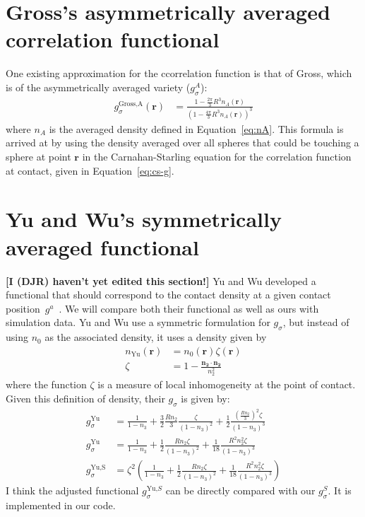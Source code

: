 \documentclass[letterpaper,twocolumn,amsmath,amssymb,jcp,10pt,aip]{revtex4-1}
\newcommand{\red}[1]{{\bf \color{red} #1}}
\newcommand{\rr}{\textbf{r}}
\newcommand{\fixme}[1]{\red{[#1]}}
\begin{document}
\section{Gross's asymmetrically averaged correlation functional}\label{sec:gross}
One existing approximation for the ccorrelation function is that of
Gross\cite{gross2009density}, which is of the asymmetrically averaged
variety ($g_\sigma^A$):
\begin{align}
  g_\sigma^\text{Gross,A}(\rr) &= \frac{1 - \frac{2\pi}{3}R^3n_A(\rr)}{\left(1 -
    \frac{4\pi}{3}R^3n_A(\rr)\right)^3}
\end{align}
where $n_A$ is the averaged density defined in Equation~\ref{eq:nA}.
This formula is arrived at by using the density averaged over all
spheres that could be touching a sphere at point $\rr$ in the
Carnahan-Starling equation for the correlation function at contact,
given in Equation~\ref{eq:cs-g}.

\section{Yu and Wu's symmetrically averaged functional}\label{sec:yuwu}

\fixme{I (DJR) haven't yet edited this section!}
Yu and Wu developed a functional that should correspond to the contact
density at a given contact
position~$g^a$~\cite{yu2002fmt-dft-inhomogeneous-associating}.  We
will compare both their functional as well as ours with simulation
data.  Yu and Wu use a symmetric formulation for $g_\sigma$, but
instead of using $n_0$ as the associated density, it uses a density
given by
\begin{align}
  n_\text{Yu}(\rr) &= n_0(\rr) \zeta(\rr) \\
  \zeta &= 1 - \frac{\mathbf{n_2}\cdot\mathbf{n_2}}{n_2^2}
\end{align}
where the function $\zeta$ is a measure of local inhomogeneity at the
point of contact.  Given this definition of density, their $g_\sigma$ is
given by:
\begin{align}
  g_\sigma^\text{Yu} &= \frac{1}{1-n_3}
    + \frac32 \frac{R n_2}{3}\frac{\zeta}{(1-n_3)^2}
    + \frac12 \frac{\left(\frac{R n_2}{3}\right)^2 \zeta}{(1-n_3)^3}
    \\
  g_\sigma^\text{Yu} &= \frac{1}{1-n_3}
    + \frac12 \frac{R n_2\zeta}{(1-n_3)^2}
    + \frac1{18} \frac{R^2 n_2^2 \zeta}{(1-n_3)^3}
    \\
  g_\sigma^\text{Yu,S} &= \zeta^2\left(\frac{1}{1-n_3}
    + \frac12 \frac{R n_2\zeta}{(1-n_3)^2}
    + \frac1{18} \frac{R^2 n_2^2 \zeta}{(1-n_3)^3}\right)
\end{align}
I think the adjusted functional $g_\sigma^{\text{Yu,}S}$ can be directly
compared with our $g_\sigma^S$.  It is implemented in our code.
\end{document}
